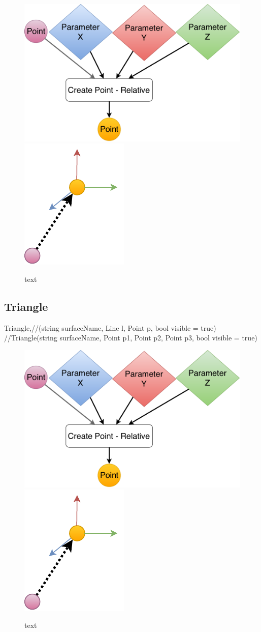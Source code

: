 \begin{figure}[H]
	\centering
	\includegraphics[height=0.3\textwidth]{obrazky-figures/Diagram/DP Navrh operacii-0D - Point2.pdf}
	\includegraphics[height=0.3\textwidth]{obrazky-figures/Diagram/Draw/1Points/DP Navrh operacii-0D - PointRelative.pdf}
	\caption{text}
	\label{fig:1}
\end{figure}


\subsection{Triangle}
	Triangle,//(string surfaceName, Line l, Point p, bool visible = true)
	//Triangle(string surfaceName, Point p1, Point p2, Point p3, bool visible = true)

\begin{figure}[H]
	\centering
	\includegraphics[height=0.3\textwidth]{obrazky-figures/Diagram/DP Navrh operacii-0D - Point2.pdf}
	\includegraphics[height=0.3\textwidth]{obrazky-figures/Diagram/Draw/1Points/DP Navrh operacii-0D - PointRelative.pdf}
	\caption{text}
	\label{fig:1}
\end{figure}


